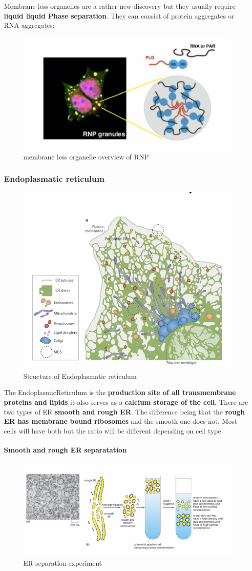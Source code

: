\documentclass[../main.tex]{subfiles}
\begin{document}
Membrane-less organelles are a rather new discovery but they usually require \textbf{liquid liquid Phase separation}. They can consist of protein aggregates or RNA aggregates:
\begin{figure}[H]
    \centering
    \includegraphics[width=0.5\linewidth]{RNP.png}
    \caption{membrane less organelle overview of \gls{RNP} }
    \label{fig:enter-label}
\end{figure}


\subsubsection{Endoplasmatic reticulum}
\begin{figure}[H]
    \centering
    \includegraphics[width=0.5\linewidth]{ER.png}
    \caption{Structure of Endoplasmatic reticulum}
    \label{fig:enter-label}
\end{figure}
The \gls{EndoplasmicReticulum} is the \textbf{production site of all transmembrane proteins and lipids } it also serves as a \textbf{calcium storage of the cell}. There are two types of ER \textbf{smooth and rough ER}. The difference being that the \textbf{rough ER has membrane bound ribosomes} and the smooth one does not. Most cells will have both but the ratio will be different depending on cell type.

\paragraph{Smooth and rough ER separatation}
\begin{figure}[H]
    \centering
    \includegraphics[width=0.5\linewidth]{ERSeparation.png}
    \caption{ER separation experiment}
    \label{fig:enter-label}
\end{figure}
\end{document}
